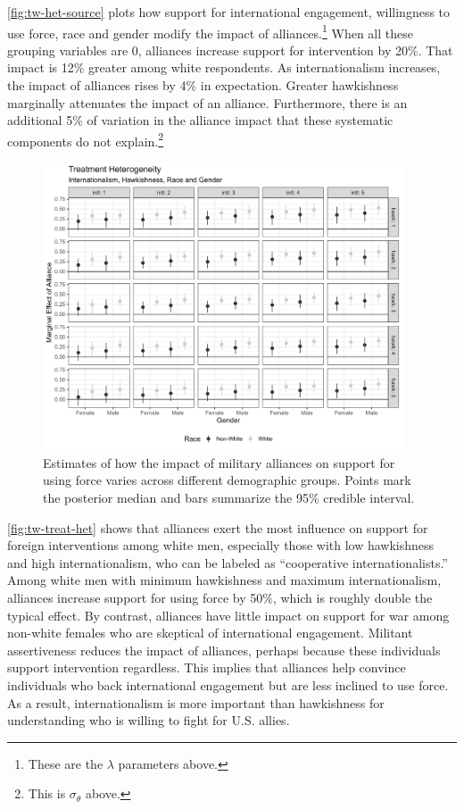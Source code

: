 \documentclass[12pt]{article}
\begin{document}
\autoref{fig:tw-het-source} plots how support for international engagement, willingness to use force, race and gender modify the impact of alliances.\footnote{These are the $\lambda$ parameters above.}
When all these grouping variables are 0, alliances increase support for intervention by 20\%. 
That impact is 12\% greater among white respondents. 
As internationalism increases, the impact of alliances rises by 4\% in expectation.
Greater hawkishness marginally attenuates the impact of an alliance. 
Furthermore, there is an additional 5\% of variation in the alliance impact that these systematic components do not explain.\footnote{This is $\sigma_\theta$ above.}


\begin{figure}[htpb]
	\centering
		\includegraphics[width=0.95\textwidth]{../figures/tw-treat-het.png}
	\caption{Estimates of how the impact of military alliances on support for using force varies across different demographic groups. Points mark the posterior median and bars summarize the 95\% credible interval.}
	\label{fig:tw-treat-het}
\end{figure}


\autoref{fig:tw-treat-het} shows that alliances exert the most influence on support for foreign interventions among white men, especially those with low hawkishness and high internationalism, who can be labeled as ``cooperative internationalists.'' 
Among white men with minimum hawkishness and maximum internationalism, alliances increase support for using force by 50\%, which is roughly double the typical effect. 
By contrast, alliances have little impact on support for war among non-white females who are skeptical of international engagement.
Militant assertiveness reduces the impact of alliances, perhaps because these individuals support intervention regardless. 
This implies that alliances help convince individuals who back international engagement but are less inclined to use force. 
As a result, internationalism is more important than hawkishness for understanding who is willing to fight for U.S. allies. 
\end{document}
